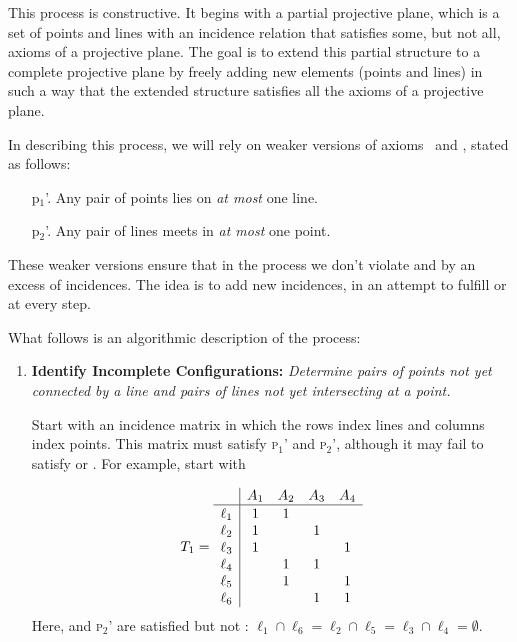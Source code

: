 \begin{xmpl}\label{xmpl:hall-plane} {}
    This process is constructive. It begins with a partial projective plane, which is a set of points and lines with an incidence relation that satisfies some, but not all, axioms of a projective plane. The goal is to extend this partial structure to a complete projective plane by freely adding new elements (points and lines) in such a way that the extended structure satisfies all the axioms of a projective plane.

    In describing this process, we will rely on weaker versions of axioms~ and , stated as follows:
    \begin{enumerate}[font=\scshape]
        \item[p$_1$\!'.] Any pair of points lies on \emph{at most} one line.
        \item[p$_2$\!'.] Any pair of lines meets in \emph{at most} one point.
    \end{enumerate}
    These weaker versions ensure that in the process we don't violate  and  by an excess of incidences. The idea is to add new incidences, in an attempt to fulfill  or  at every step.

    What follows is an algorithmic description of the process:
    \begin{enumerate}[1.]
        \item \textbf{Identify Incomplete Configurations:} \textit{Determine pairs of points not yet connected by a line and pairs of lines not yet intersecting at a point.}

        Start with an incidence matrix in which the rows index lines and columns index points. This matrix must satisfy \textsc{p$_1$\!'} and \textsc{p$_2$\!'}, although it may fail to satisfy  or . For example, start with

        \vspace{-2\parskip}
        \small
        \begin{equation}\label{eq:T1}
            T_1 = \begin{array}{l|cccc}
                &A_1&A_2&A_3&A_4\\
                \hline\rule{0pt}{9pt}
                \ell_1&1&1\\
                \ell_2&1&&1\\
                \ell_3&1&&&1\\
                \ell_4&&1&1\\
                \ell_5&&1&&1\\
                \ell_6&&&1&1
            \end{array}            
        \end{equation}
        \normalsize
        Here,  and \textsc{p$_2$\!}' are satisfied but not : $\ell_1\cap\ell_6=\ell_2\cap\ell_5=\ell_3\cap\ell_4=\emptyset$. 


\end{enumerate}
\end{xmpl}
